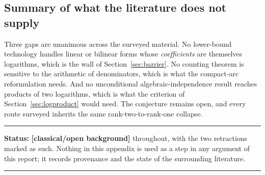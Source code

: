 \documentclass[11pt,oneside]{article}
\theoremstyle{definition}
\theoremstyle{remark}
\newcommand{\statusknown}{\textcolor{classicalgray}{\textbf{[classical/open background]}}}
\newenvironment{statusbox}[1]
{\begin{center}\begin{minipage}{0.94\textwidth}\raggedright\hbadness=10000\hrule
\vspace{0.45em}\textbf{Status:} #1\par\vspace{0.35em}}
{\vspace{0.35em}\hrule\end{minipage}\end{center}}
\begin{document}
\subsection{Summary of what the literature does not supply}

Three gaps are unanimous across the surveyed material.  No lower-bound technology handles
linear or bilinear forms whose \emph{coefficients} are themselves logarithms, which is the wall
of Section~\ref{sec:barrier}.  No counting theorem is sensitive to the arithmetic of
denominators, which is what the compact-arc reformulation needs.  And no unconditional
algebraic-independence result reaches products of two logarithms, which is what the criterion
of Section~\ref{sec:logproduct} would need.  The conjecture remains open, and every route
surveyed inherits the same rank-two-to-rank-one collapse.

\begin{statusbox}{\statusknown{} throughout, with the two retractions marked as such.  Nothing
in this appendix is used as a step in any argument of this report; it records provenance and
the state of the surrounding literature.}
\end{statusbox}
\end{document}
